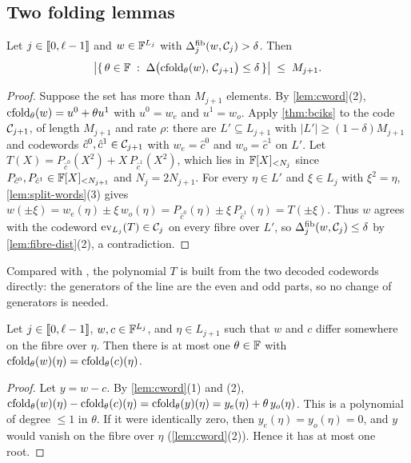 \subsection{Two folding lemmas}\label{sec:sound:lemmas}

\begin{lemma}\label{lem:far}
Let $j \in \llbracket 0, \ell-1 \rrbracket$ and $w \in \mathbb{F}^{L_j}$ with $\Delta^{\mathrm{fib}}_j(w, \mathcal{C}_j) > \delta$. Then
\[
  \bigl|\{\, \theta \in \mathbb{F} \;:\; \Delta\bigl(\mathrm{cfold}_\theta(w),\, \mathcal{C}_{j+1}\bigr) \le \delta \,\}\bigr| \;\le\; M_{j+1}.
\]
\end{lemma}

\begin{proof}
Suppose the set has more than $M_{j+1}$ elements. By \cref{lem:cword}(2), $\mathrm{cfold}_\theta(w) = u^0 + \theta u^1$ with $u^0 = w_e$ and $u^1 = w_o$.
Apply \cref{thm:bciks} to the code $\mathcal{C}_{j+1}$, of length $M_{j+1}$ and rate $\rho$: there are $L' \subseteq L_{j+1}$ with $|L'| \ge (1-\delta)M_{j+1}$ and codewords $\hat c^0, \hat c^1 \in \mathcal{C}_{j+1}$ with $w_e = \hat c^0$ and $w_o = \hat c^1$ on $L'$.
Let $T(X) = P_{\hat c^0}(X^2) + X\, P_{\hat c^1}(X^2)$, which lies in $\mathbb{F}[X]_{<N_j}$ since $P_{\hat c^0}, P_{\hat c^1} \in \mathbb{F}[X]_{<N_{j+1}}$ and $N_j = 2N_{j+1}$.
For every $\eta \in L'$ and $\xi \in L_j$ with $\xi^2 = \eta$, \cref{lem:split-words}(3) gives
$w(\pm \xi) = w_e(\eta) \pm \xi\, w_o(\eta) = P_{\hat c^0}(\eta) \pm \xi\, P_{\hat c^1}(\eta) = T(\pm \xi)$.
Thus $w$ agrees with the codeword $\mathrm{ev}_{L_j}(T) \in \mathcal{C}_j$ on every fibre over $L'$, so $\Delta^{\mathrm{fib}}_j(w, \mathcal{C}_j) \le \delta$ by \cref{lem:fibre-dist}(2), a contradiction.
\end{proof}

Compared with , the polynomial $T$ is built from the two decoded codewords directly: the generators of the line are the even and odd parts, so no change of generators is needed.

\begin{lemma}\label{lem:survive}
Let $j \in \llbracket 0, \ell-1 \rrbracket$, $w, c \in \mathbb{F}^{L_j}$, and $\eta \in L_{j+1}$ such that $w$ and $c$ differ somewhere on the fibre over $\eta$. Then there is at most one $\theta \in \mathbb{F}$ with $\mathrm{cfold}_\theta(w)(\eta) = \mathrm{cfold}_\theta(c)(\eta)$.
\end{lemma}

\begin{proof}
Let $y = w - c$. By \cref{lem:cword}(1) and (2), $\mathrm{cfold}_\theta(w)(\eta) - \mathrm{cfold}_\theta(c)(\eta) = \mathrm{cfold}_\theta(y)(\eta) = y_e(\eta) + \theta\, y_o(\eta)$.
This is a polynomial of degree $\le 1$ in $\theta$. If it were identically zero, then $y_e(\eta) = y_o(\eta) = 0$, and $y$ would vanish on the fibre over $\eta$ (\cref{lem:cword}(2)). Hence it has at most one root.
\end{proof}

